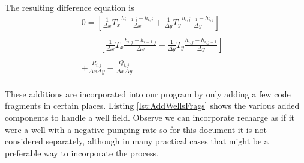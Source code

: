 The resulting difference equation is 
\begin{equation}
\begin{matrix}
0= 
[\frac{1}{\Delta x} T_{x} \frac{h_{i-1,j} - h_{i,j}}{\Delta x} +
 \frac{1}{\Delta y} T_{y} \frac{h_{i,j-1} - h_{i,j}}{\Delta y}] - \\
~~~~~~~~~~\\
~~~~~~~~~~[ \frac{1}{\Delta x} T_{x}  \frac{h_{i,j} - h_{i+1,j}}{\Delta x} +
  \frac{1}{\Delta y}  T_{y} \frac{h_{i,j} - h_{i,j+1}}{\Delta y} ]  \\
  ~~~~~~~\\
  + \frac{R_{i,j}}{\Delta x \Delta y} - \frac{Q_{i,j}}{\Delta x \Delta y} \\
\end{matrix}        
\end{equation}

These additions are incorporated into our program by only adding a few code fragments in certain places.
Listing \ref{lst:AddWellsFrags} shows the various added components to handle a well field.  
Observe we can incorporate recharge as if it were a well with a negative pumping rate so for this document it is not considered separately, although in many practical cases that might  be a preferable way to incorporate the process.

